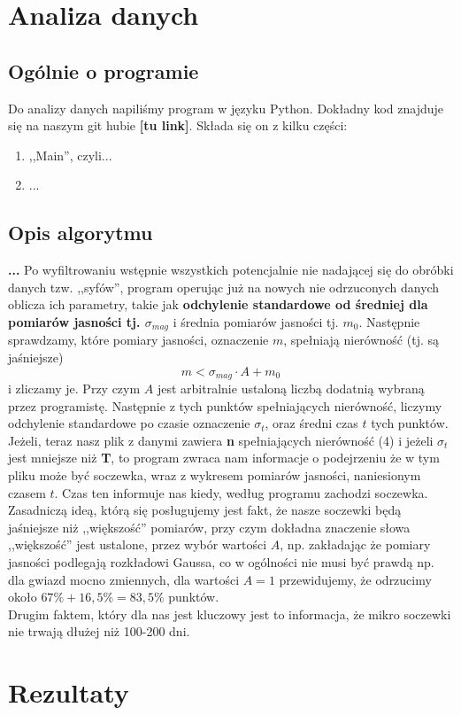 \documentclass[a4paper,11pt]{article}
\newcommand{\ak}{\hspace{0.7 cm}}
\begin{document}
\section{Analiza danych}
\subsection{Ogólnie o programie}
\ak Do analizy danych napiliśmy program w języku Python. Dokładny kod znajduje się na naszym git hubie \textbf{[tu link]}. Składa się on z kilku części:
\begin{enumerate}
\item ,,Main'', czyli... 
\item ...
\end{enumerate} 
\subsection{Opis algorytmu}
\ak \textbf{...} Po wyfiltrowaniu wstępnie wszystkich potencjalnie nie nadającej się do obróbki danych tzw. ,,syfów'', program operując już na nowych nie odrzuconych danych oblicza ich parametry, takie jak \textbf{odchylenie standardowe od średniej dla pomiarów jasności tj.  $\sigma_{mag}$} i średnia pomiarów jasności tj. $m_0$. Następnie  sprawdzamy, które pomiary jasności, oznaczenie $m$, spełniają nierówność (tj. są jaśniejsze)
\begin{equation}
m<\sigma_{mag}\cdot A+m_0
\end{equation}  i zliczamy je. Przy czym $A$ jest arbitralnie ustaloną liczbą dodatnią wybraną przez programistę. Następnie z tych punktów spełniających nierówność, liczymy odchylenie standardowe po czasie oznaczenie $\sigma_t$, oraz średni czas $t$ tych punktów.
\\
\ak Jeżeli, teraz nasz plik z danymi zawiera \textbf{{n}} spełniających nierówność (4) i jeżeli $\sigma_t$ jest mniejsze niż \textbf{T}, to program zwraca nam informacje o podejrzeniu że w tym pliku może być soczewka, wraz z wykresem pomiarów jasności, naniesionym czasem $t$. Czas ten informuje nas kiedy, według programu zachodzi soczewka.
\\
\ak Zasadniczą ideą, którą się posługujemy jest fakt, że nasze soczewki będą jaśniejsze niż ,,większość'' pomiarów, przy czym dokładna znaczenie słowa ,,większość'' jest ustalone, przez wybór wartości $A$, np. zakładając że pomiary jasności podlegają rozkładowi Gaussa, co w ogólności nie musi być prawdą np. dla gwiazd mocno zmiennych, dla wartości $A=1$ przewidujemy, że odrzucimy około $67\%+16,5\%=83,5\%$ punktów. 
\\ 
\ak Drugim faktem, który dla nas jest kluczowy jest to informacja, że mikro soczewki nie trwają dłużej niż 100-200 dni.

\section{Rezultaty}

\end{document}
